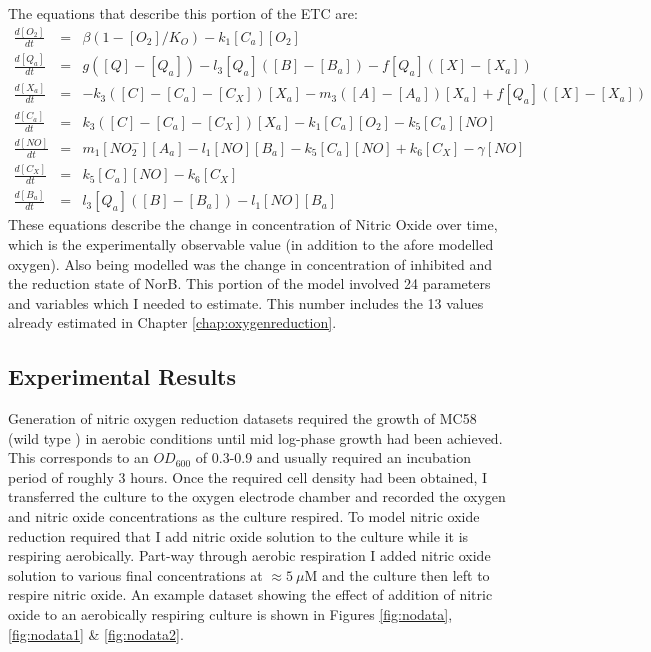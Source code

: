The equations that describe this portion of the ETC are:
\begin{eqnarray*}
\frac{d[O_2]}{dt} & = & \beta(1-[O_2]/K_O) - k_{1}[C_a][O_2]\\
\frac{d[Q_a]}{dt} & = & g([Q] - [Q_a]) - l_3[Q_a]([B] - [B_a]) - f[Q_a]([X]-[X_a])\\
\frac{d[X_a]}{dt} & = & -k_3([C] - [C_a] - [C_X])[X_a]  - m_3([A] - [A_a])[X_a] + f[Q_a]([X]-[X_a])\\
\frac{d[C_a]}{dt} & = & k_3([C] - [C_a] - [C_X])[X_a] - k_{1}[C_a][O_2] - k_5[C_a][NO]\\
\frac{d[NO]}{dt} & = & m_{1}[NO_2^-][A_a] - l_1[NO][B_a] - k_5[C_a][NO] + k_6 [C_X] - \gamma[NO]\\
\frac{d[C_X]}{dt} & = & k_5[C_a][NO] - k_6 [C_X]\\
\frac{d[B_a]}{dt} & = & l_3[Q_a]([B] - [B_a]) - l_1[NO][B_a]
\end{eqnarray*}
These equations describe the change in concentration of Nitric Oxide over time, which is the experimentally observable value (in addition to the afore modelled oxygen). Also being modelled was the change in concentration of inhibited \cbbthree{} and the reduction state of NorB. This portion of the model involved 24 parameters and variables which I needed to estimate. This number includes the 13 values already estimated in Chapter \ref{chap:oxygenreduction}.
\subsection{Experimental Results}
Generation of nitric oxygen reduction datasets required the growth of MC58 (wild type \Nsm{}) in aerobic conditions until mid log-phase growth had been achieved. This corresponds to an $OD_{600}$ of 0.3-0.9 and usually required an incubation period of roughly 3 hours. Once the required cell density had been obtained, I transferred the culture to the oxygen electrode chamber and recorded the oxygen and nitric oxide concentrations as the culture respired. To model nitric oxide reduction required that I add nitric oxide solution to the culture while it is respiring aerobically. Part-way through aerobic respiration I added nitric oxide solution to various final concentrations at $\approx 5~\mu$M and the culture then left to respire nitric oxide. An example dataset showing the effect of addition of nitric oxide to an aerobically respiring culture is shown in Figures \ref{fig:nodata}, \ref{fig:nodata1} \& \ref{fig:nodata2}.

